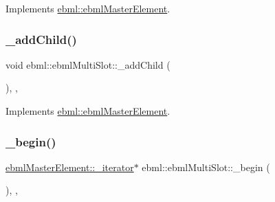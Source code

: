 Implements \mbox{\hyperlink{classebml_1_1ebmlMasterElement_a59c5f3b3409fd5fd6f0f22c7a68f1c9b}{ebml\+::ebml\+Master\+Element}}.

\mbox{\label{classebml_1_1ebmlMultiSlot_aa8d38591ef1932423e2f62d42cc4967c}} 
\subsubsection{\texorpdfstring{\+\_\+add\+Child()}{\_addChild()}\hspace{0.1cm}{\footnotesize\ttfamily [2/2]}}
{\footnotesize\ttfamily void ebml\+::ebml\+Multi\+Slot\+::\+\_\+add\+Child (\begin{DoxyParamCaption}\item[{\mbox{\hyperlink{namespaceebml_adad533b7705a16bb360fe56380c5e7be}{ebml\+Element\+\_\+sp}} \&\&}]{ }\end{DoxyParamCaption})\hspace{0.3cm}{\ttfamily [override]}, {\ttfamily [protected]}, {\ttfamily [virtual]}}



Implements \mbox{\hyperlink{classebml_1_1ebmlMasterElement_a3af0270846a1ced1719d26dd261f0355}{ebml\+::ebml\+Master\+Element}}.

\mbox{\label{classebml_1_1ebmlMultiSlot_a61a2bb09ccbf771a9023774e0cdcbad2}} 
\subsubsection{\texorpdfstring{\+\_\+begin()}{\_begin()}}
{\footnotesize\ttfamily \mbox{\hyperlink{classebml_1_1ebmlMasterElement_1_1__iterator}{ebml\+Master\+Element\+::\+\_\+iterator}}$\ast$ ebml\+::ebml\+Multi\+Slot\+::\+\_\+begin (\begin{DoxyParamCaption}{ }\end{DoxyParamCaption})\hspace{0.3cm}{\ttfamily [override]}, {\ttfamily [protected]}, {\ttfamily [virtual]}}



